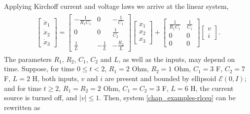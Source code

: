 \documentclass[letterpaper,10pt,english]{sphinxmanual}
\begin{document}
Applying Kirchoff current and voltage laws we arrive at the linear
system,
\label{chap_examples:equation-rlceq}\begin{gather}
\begin{split}\left[\begin{array}{c}
\dot{x}_1\\
\dot{x}_2\\
\dot{x}_3\end{array}\right] = \left[\begin{array}{ccc}
-\frac{1}{R_1C_1} & 0 & -\frac{1}{C_1}\\
0 & 0 & \frac{1}{C_2}\\
\frac{1}{L} & -\frac{1}{L} & -\frac{R_2}{L}\end{array}\right]
\left[\begin{array}{c}
x_1\\
x_2\\
x_3\end{array}\right] + \left[\begin{array}{cc}
\frac{1}{R_1C_1} & \frac{1}{C_1}\\
0 & 0\\
0 & 0\end{array}\right]\left[\begin{array}{c}
v\\
i\end{array}\right].\end{split}\label{chap_examples-rlceq}
\end{gather}
The parameters $R_1$, $R_2$, $C_1$, $C_2$ and
$L$, as well as the inputs, may depend on time. Suppose, for time
$0\leqslant t<2$, $R_1=2$ Ohm, $R_2=1$ Ohm,
$C_1=3$ F, $C_2=7$ F, $L=2$ H, both inputs, $v$
and $i$ are present and bounded by ellipsoid
${\mathcal E}(0,I)$; and for time $t\geqslant2$,
$R_1=R_2=2$ Ohm, $C_1=C_2=3$ F, $L=6$ H, the current
source is turned off, and $|v|\leqslant1$. Then, system \eqref{chap_examples-rlceq}
can be rewritten as
\end{document}
